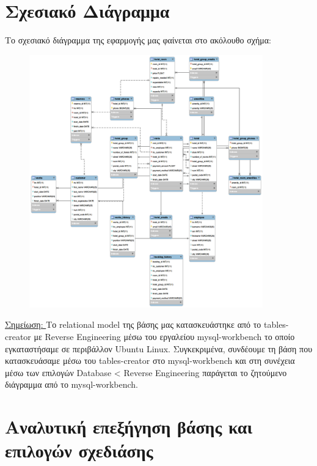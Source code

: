 \documentclass[a4paper,oneside, 11pt]{article}
\begin{document}
\section{Σχεσιακό Διάγραμμα}
Το σχεσιακό διάγραμμα της εφαρμογής μας φαίνεται στο ακόλουθο σχήμα:
\begin{figure}[H]
\center
\includegraphics[width=0.9\textwidth]{eer.png}
\bigbreak 
\end{figure}
\underline{Σημείωση: } Το relational model της βάσης μας κατασκευάστηκε από το tables-creator με Reverse Engineering μέσω του εργαλείου mysql-workbench το οποίο εγκαταστήσαμε σε περιβάλλον Ubuntu Linux. Συγκεκριμένα, συνδέουμε τη βάση που κατασκευάσαμε μέσω του tables-creator στο mysql-workbench και στη συνέχεια μέσω των επιλογών Database < Reverse Engineering παράγεται το ζητούμενο διάγραμμα από το mysql-workbench.

\section{Αναλυτική επεξήγηση βάσης και επιλογών σχεδιάσης}
\end{document}
